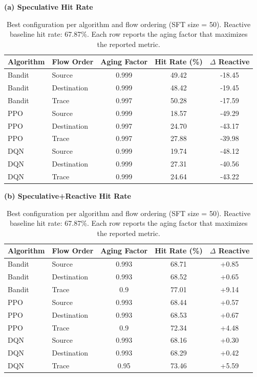 \begin{table}[t]
\centering
\caption{Best configuration per algorithm and flow ordering (SFT size = 50). Reactive baseline hit rate: 67.87\%. Each row reports the aging factor that maximizes the reported metric.}
\label{tab:combined-metrics-tablesize50}
\small
\textbf{(a) Speculative Hit Rate}\\[0.4em]
\begin{tabular}{@{}llccc@{}}
\toprule
Algorithm & Flow Order & Aging Factor & Hit Rate (\%) & $\Delta$ Reactive \\
\midrule
Bandit & Source & 0.999 & 49.42 & -18.45 \\
Bandit & Destination & 0.999 & 48.42 & -19.45 \\
Bandit & Trace & 0.997 & 50.28 & -17.59 \\
PPO & Source & 0.999 & 18.57 & -49.29 \\
PPO & Destination & 0.997 & 24.70 & -43.17 \\
PPO & Trace & 0.997 & 27.88 & -39.98 \\
DQN & Source & 0.999 & 19.74 & -48.12 \\
DQN & Destination & 0.999 & 27.31 & -40.56 \\
DQN & Trace & 0.999 & 24.64 & -43.22 \\
\bottomrule
\end{tabular}

\vspace{0.8em}
\textbf{(b) Speculative+Reactive Hit Rate}\\[0.4em]
\begin{tabular}{@{}llccc@{}}
\toprule
Algorithm & Flow Order & Aging Factor & Hit Rate (\%) & $\Delta$ Reactive \\
\midrule
Bandit & Source & 0.993 & 68.71 & +0.85 \\
Bandit & Destination & 0.993 & 68.52 & +0.65 \\
Bandit & Trace & 0.9 & 77.01 & +9.14 \\
PPO & Source & 0.993 & 68.44 & +0.57 \\
PPO & Destination & 0.993 & 68.53 & +0.67 \\
PPO & Trace & 0.9 & 72.34 & +4.48 \\
DQN & Source & 0.993 & 68.16 & +0.30 \\
DQN & Destination & 0.993 & 68.29 & +0.42 \\
DQN & Trace & 0.95 & 73.46 & +5.59 \\
\bottomrule
\end{tabular}


\end{table}
